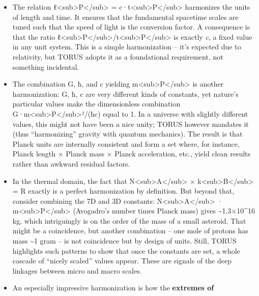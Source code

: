 \begin{itemize}
\item
  The relation
  ℓ\textless{}sub\textgreater{}P\textless{}/sub\textgreater{} =
  c·t\textless{}sub\textgreater{}P\textless{}/sub\textgreater{}
  harmonizes the units of length and time. It ensures that the
  fundamental spacetime scales are tuned such that the speed of light is
  the conversion factor. A consequence is that the ratio
  ℓ\textless{}sub\textgreater{}P\textless{}/sub\textgreater{}/t\textless{}sub\textgreater{}P\textless{}/sub\textgreater{}
  is exactly \emph{c}, a fixed value in any unit system. This is a
  simple harmonization -- it's expected due to relativity, but TORUS
  adopts it as a foundational requirement, not something incidental.
\item
  The combination G, ħ, and c yielding
  m\textless{}sub\textgreater{}P\textless{}/sub\textgreater{} is another
  harmonization: G, ħ, c are very different kinds of constants, yet
  nature's particular values make the dimensionless combination
  G·m\textless{}sub\textgreater{}P\textless{}/sub\textgreater{}²/(ħc)
  equal to 1​. In a universe with slightly different values, this might
  not have been a nice unity; TORUS however mandates it (thus
  ``harmonizing'' gravity with quantum mechanics). The result is that
  Planck units are internally consistent and form a set where, for
  instance, Planck length × Planck mass × Planck acceleration, etc.,
  yield clean results rather than awkward residual factors.
\item
  In the thermal domain, the fact that
  N\textless{}sub\textgreater{}A\textless{}/sub\textgreater{} ×
  k\textless{}sub\textgreater{}B\textless{}/sub\textgreater{} = R
  exactly is a perfect harmonization by definition. But beyond that,
  consider combining the 7D and 3D constants:
  N\textless{}sub\textgreater{}A\textless{}/sub\textgreater{} ·
  m\textless{}sub\textgreater{}P\textless{}/sub\textgreater{}
  (Avogadro's number times Planck mass) gives
  \textasciitilde{}1.3×10\^{}16 kg​, which intriguingly is on the order
  of the mass of a small asteroid. That might be a coincidence, but
  another combination -- one mole of protons has mass \textasciitilde{}1
  gram -- is not coincidence but by design of units. Still, TORUS
  highlights such patterns to show that once the constants are set, a
  whole cascade of ``nicely scaled'' values appear. These are signals of
  the deep linkages between micro and macro scales.
\item
  An especially impressive harmonization is how the \textbf{extremes of
}
\end{itemize}
